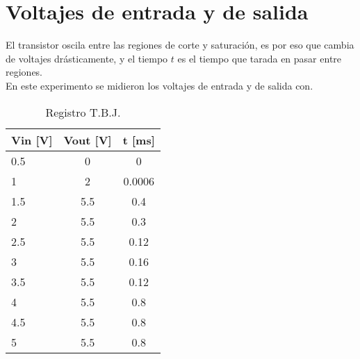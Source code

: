 \documentclass{article}
\begin{document}
\section{Voltajes de entrada y de salida}

El transistor oscila entre las regiones de corte y saturación, es por eso que cambia de voltajes drásticamente, y el tiempo $t$
es el tiempo que tarada en pasar entre regiones.\\

En este experimento se midieron los voltajes de entrada y de salida con.\\

\begin{table}[ht!]
\centering

\begin{tabular}{|l|c|c|}
\hline
Vin {[}V{]} & \multicolumn{1}{l|}{Vout {[}V{]}} & \multicolumn{1}{l|}{t {[}ms{]}} \\ \hline
0.5         & 0                                 & 0                               \\ \hline
1           & 2                                 & 0.0006                          \\ \hline
1.5         & 5.5                               & 0.4                             \\ \hline
2           & 5.5                               & 0.3                             \\ \hline
2.5         & 5.5                               & 0.12                            \\ \hline
3           & 5.5                               & 0.16                            \\ \hline
3.5         & 5.5                               & 0.12                            \\ \hline
4           & 5.5                               & 0.8                             \\ \hline
4.5         & 5.5                               & 0.8                             \\ \hline
5           & 5.5                               & 0.8                             \\ \hline
\end{tabular}

\caption{Registro T.B.J.}
\label{VinVout}
\end{table}
\end{document}

